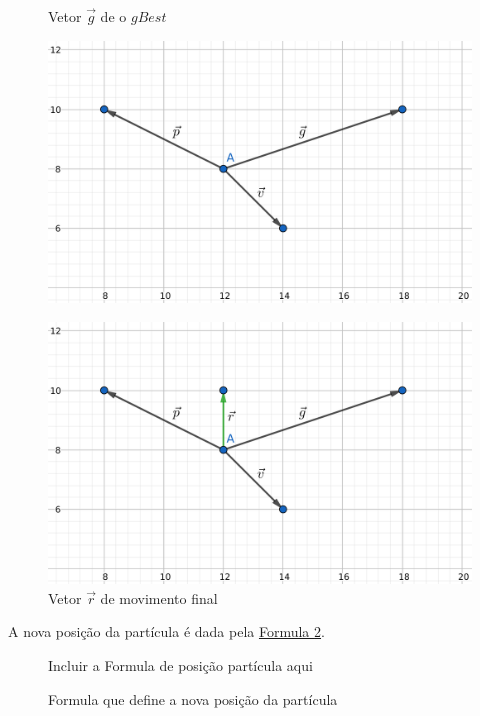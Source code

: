 \begin{figure}[!htb]
\begin{minipage}{\textwidth}
\begin{minipage}{0.48\textwidth}
\centering
\caption{Vetor $\vec g$ de o $gBest$}
\label{fig:vetor-g}
\includegraphics[width=.9\linewidth]{assets/vec3.png}
\end{minipage}
\begin{minipage}{0.48\textwidth}
\centering
\caption{Vetor $\vec r$ de movimento final}
\label{fig:vetor-r}
\includegraphics[width=.9\linewidth]{assets/vec4.png}
\end{minipage}

\end{minipage}
\end{figure}

\noindent A nova posição da partícula é dada pela 
\hyperref[fig:formula-nova-posicao]{Formula \ref{fig:formula-nova-posicao}}.

\begin{figure}[ht]
\centering
\small{Incluir a Formula de posição partícula aqui}
\caption{Formula que define a nova posição da partícula}
\label{fig:formula-nova-posicao}
\end{figure}

